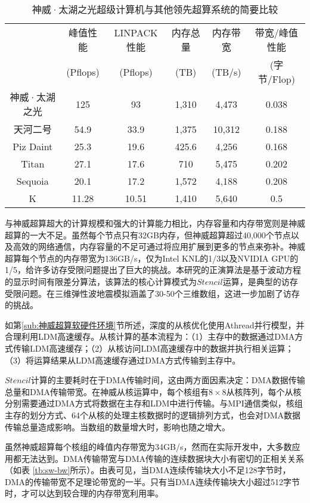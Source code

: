 \begin{table}[ht]
\footnotesize
\caption{神威·太湖之光超级计算机与其他领先超算系统的简要比较}
\label{tb:supercomputer-comp}
\center
\begin{tabular}{cccccc}
\hline
   & 峰值性能 & LINPACK性能 & 内存总量  &内存带宽 & 带宽/峰值性能 \\
   & (Pflops) & (Pflops) & (TB) & (TB/s) & (字节/Flop) \\
   \hline
   神威·太湖之光 & 125 & 93 & 1,310 & 4,473 & 0.038 \\
   天河二号 & 54.9 & 33.9 & 1,375 & 10,312 & 0.188 \\
   Piz Daint & 25.3 & 19.6 & 425.6 & 4,256 & 0.168 \\
   Titan & 27.1 & 17.6 & 710 & 5,475 & 0.202 \\
   Sequoia & 20.1 & 17.2 & 1,572 & 4,188 & 0.208 \\
   K & 11.28 & 10.51 & 1,410 & 5,640 & 0.5 \\
\hline
\end{tabular}
\end{table}

与神威超算超大的计算规模和强大的计算能力相比，内存容量和内存带宽则是神威超算的一大不足。虽然每个节点只有32GB内存，但神威超算超过40,000个节点以及高效的网络通信，内存容量的不足可通过将应用扩展到更多的节点来弥补。神威超算每个节点的内存带宽为136GB/s，仅为Intel KNL的1/3以及NVIDIA GPU的1/5，给许多访存受限问题提出了巨大的挑战。本研究的正演算法是基于波动方程的显示时间有限差分算法，该算法的核心计算模式为$Stencil$运算，是典型的访存受限问题。在三维弹性波地震模拟涵盖了30-50个三维数组，这进一步加剧了访存的挑战。

如第\ref{sub:神威超算软硬件环境}节所述，深度的从核优化使用Athread并行模型，并合理利用LDM高速缓存。从核计算的基本流程为：（1）主存中的数据通过DMA方式传输LDM高速缓存；（2）从核访问LDM高速缓存中的数据并执行相关运算；（3）将运算结果从LDM高速缓存通过DMA方式传输到主存中。

$Stencil$计算的主要耗时在于DMA传输时间，这由两方面因素决定：DMA数据传输总量和DMA传输带宽。在神威从核运算中，每个核组有$8\times8$从核阵列，每个从核分别需要通过DMA方式将数据在主存和LDM中进行传输。与MPI通信类似，核组主存的划分方式、64个从核的处理主核数据时的逻辑排列方式，也会对DMA数据传输总量造成影响。当数组的数量增大时，影响也随之增大。


虽然神威超算每个核组的峰值内存带宽为34GB/s，然而在实际开发中，大多数应用都无法达到。DMA传输带宽与DMA传输的连续数据块大小有密切的正相关关系（如表
\ref{tb:sw-bw}所示）。由表可见，当DMA连续传输块大小不足128字节时，DMA的传输带宽不足理论带宽的一半。只有当DMA连续传输块大小超过512字节时，才可以达到较合理的内存带宽利用率。

